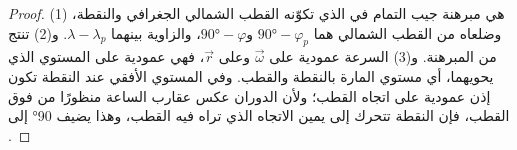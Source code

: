 \begin{proof}
(1) هي مبرهنة جيب التمام في  الذي تكوّنه القطب الشمالي الجغرافي  والنقطة، وضلعاه من القطب الشمالي هما $\ang{90} - \varphi_p$ و$\ang{90} - \varphi$، والزاوية بينهما $\lambda - \lambda_p$. و(2) تنتج من المبرهنة. و(3) السرعة عمودية على $\vec\omega$ وعلى $\vec r$، فهي عمودية على المستوي الذي يحويهما، أي مستوي  المارة بالنقطة والقطب. وفي المستوي الأفقي عند النقطة تكون إذن عمودية على اتجاه القطب؛ ولأن الدوران عكس عقارب الساعة منظورًا من فوق القطب، فإن النقطة تتحرك إلى يمين الاتجاه الذي تراه فيه القطب، وهذا يضيف \ang{90} إلى .
\end{proof}

